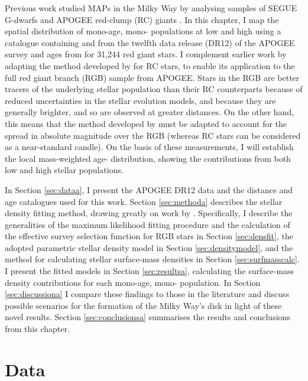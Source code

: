  Previous work studied MAPs in the Milky Way by analysing samples of SEGUE G-dwarfs \citep{2012ApJ...755..115B,2012ApJ...753..148B,2012ApJ...751..131B} and APOGEE red-clump (RC) giants \citep{2016ApJ...823...30B}. In this chapter, I map the spatial distribution of mono-age, mono-\feh{} populations at low and high \afe{} using a catalogue containing \feh{} and \afe{} from the twelfth data release (DR12) of the APOGEE survey \citep{2015arXiv150905420M} and ages from \citet{2016MNRAS.456.3655M} for 31,244 red giant stars. I complement earlier work by adapting the method developed by \citet{2016ApJ...823...30B} for RC stars, to enable its application to the full red giant branch (RGB) sample from APOGEE. Stars in the RGB are better tracers of the underlying stellar population than their RC counterparts because of reduced uncertainties in the stellar evolution models, and because they are generally brighter, and so are observed at greater distances. On the other hand, this means that the method developed by  \citet{2016ApJ...823...30B} must be adapted to account for the spread in absolute magnitude over the RGB (whereas RC stars can be considered as a near-standard candle). On the basis of these measurements, I will establish the local mass-weighted age-\feh{} distribution, showing the contributions from both low and high \afe{} stellar populations.

 In Section \ref{sec:dataa}, I present the APOGEE DR12 data and the distance and age catalogues used for this work. Section \ref{sec:methoda} describes the stellar density fitting method, drawing greatly on work by \citet{2016ApJ...818..130B,2016ApJ...823...30B}. Specifically, I describe the generalities of the maximum likelihood fitting procedure and the calculation of the effective survey selection function for RGB stars in Section \ref{sec:densfit}, the adopted parametric stellar density model in Section \ref{sec:densitymodel}, and the method for calculating stellar surface-mass densities in Section \ref{sec:surfmasscalc}. I present the fitted models in Section \ref{sec:resultsa}, calculating the surface-mass density contributions for each mono-age, mono-\feh{} population. In Section \ref{sec:discussiona} I compare these findings to those in the literature and discuss possible scenarios for the formation of the Milky Way's disk in light of these novel results. Section \ref{sec:conclusionsa} summarises the results and conclusions from this chapter. 


 \section{Data}

